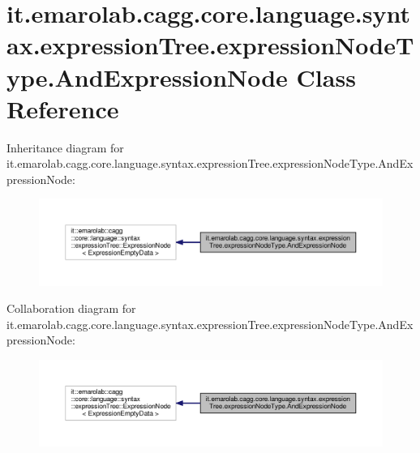 \hypertarget{classit_1_1emarolab_1_1cagg_1_1core_1_1language_1_1syntax_1_1expressionTree_1_1expressionNodeType_1_1AndExpressionNode}{\section{it.\-emarolab.\-cagg.\-core.\-language.\-syntax.\-expression\-Tree.\-expression\-Node\-Type.\-And\-Expression\-Node Class Reference}
\label{classit_1_1emarolab_1_1cagg_1_1core_1_1language_1_1syntax_1_1expressionTree_1_1expressionNodeType_1_1AndExpressionNode}
}


Inheritance diagram for it.\-emarolab.\-cagg.\-core.\-language.\-syntax.\-expression\-Tree.\-expression\-Node\-Type.\-And\-Expression\-Node\-:\nopagebreak
\begin{figure}[H]
\begin{center}
\leavevmode
\includegraphics[width=350pt]{classit_1_1emarolab_1_1cagg_1_1core_1_1language_1_1syntax_1_1expressionTree_1_1expressionNodeTypd744a1bc61d1235f309a82eeedc74473}
\end{center}
\end{figure}


Collaboration diagram for it.\-emarolab.\-cagg.\-core.\-language.\-syntax.\-expression\-Tree.\-expression\-Node\-Type.\-And\-Expression\-Node\-:\nopagebreak
\begin{figure}[H]
\begin{center}
\leavevmode
\includegraphics[width=350pt]{classit_1_1emarolab_1_1cagg_1_1core_1_1language_1_1syntax_1_1expressionTree_1_1expressionNodeTyp252cf2f334ba1479ed261335244f40f8}
\end{center}
\end{figure}
